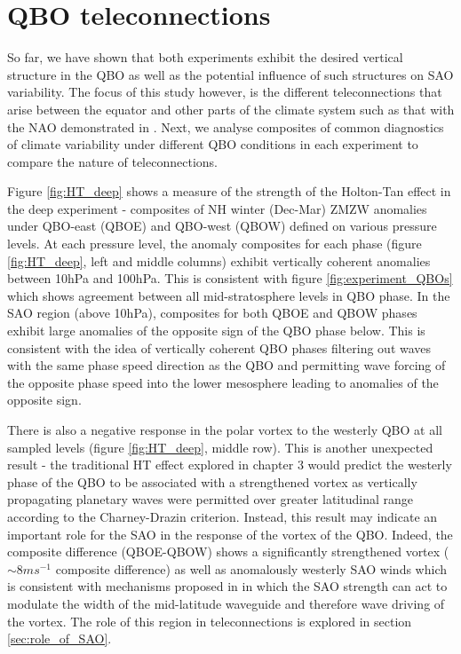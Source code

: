 \section{QBO teleconnections}
So far, we have shown that both experiments exhibit the desired vertical structure in the QBO as well as the potential influence of such structures on SAO variability. The focus of this study however, is the different teleconnections that arise between the equator and other parts of the climate system such as that with the NAO demonstrated in \cite{andrewsObserved2019}. Next, we analyse composites of common diagnostics of climate variability under different QBO conditions in each experiment to compare the nature of teleconnections. 

Figure \ref{fig:HT_deep} shows a measure of the strength of the Holton-Tan effect in the deep experiment -  composites of NH winter (Dec-Mar) ZMZW anomalies under QBO-east (QBOE) and QBO-west (QBOW) defined on various pressure levels. At each pressure level, the anomaly composites for each phase (figure \ref{fig:HT_deep}, left and middle columns) exhibit vertically coherent anomalies between 10hPa and 100hPa. This is consistent with figure \ref{fig:experiment_QBOs} which shows agreement between all mid-stratosphere levels in QBO phase. In the SAO region (above 10hPa), composites for both QBOE and QBOW phases exhibit large anomalies of the opposite sign of the QBO phase below. This is consistent with the idea of vertically coherent QBO phases filtering out waves with the same phase speed direction as the QBO and permitting wave forcing of the opposite phase speed into the lower mesosphere leading to anomalies of the opposite sign. 

There is also a negative response in the polar vortex to the westerly QBO at all sampled levels (figure \ref{fig:HT_deep}, middle row). This is another unexpected result - the traditional HT effect explored in chapter 3 would predict the westerly phase of the QBO to be associated with a strengthened vortex as vertically propagating planetary waves were permitted over greater latitudinal range according to the Charney-Drazin criterion. Instead, this result may indicate an important role for the SAO in the response of the vortex of the QBO. Indeed, the composite difference (QBOE-QBOW) shows a significantly strengthened vortex ($\sim 8 ms^{-1}$ composite difference) as well as anomalously westerly SAO winds which is consistent with mechanisms proposed in \cite{grayForecasting2020} in which the SAO strength can act to modulate the width of the mid-latitude waveguide and therefore wave driving of the vortex. The role of this region in teleconnections is explored in section \ref{sec:role_of_SAO}.

